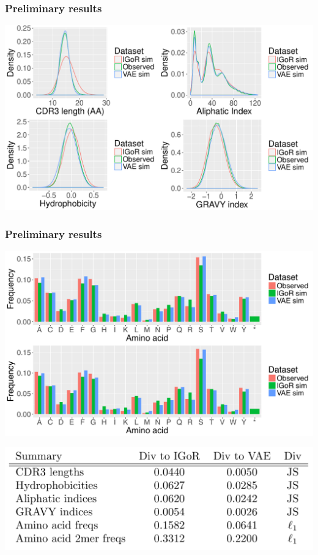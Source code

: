 \documentclass[mathserif,compress]{beamer}
\renewcommand\;{\,}
\begin{document}
\begin{frame}\frametitle{Preliminary results}
\begin{center}
\includegraphics[width=\linewidth]{Images/physiochem.pdf}
\end{center}
\end{frame}

\begin{frame}\frametitle{Preliminary results}
\begin{center}
\includegraphics[width=\linewidth]{Images/aa.pdf}
\end{center}
\begin{center}
\includegraphics[width=\linewidth]{Images/DivTable.png}
\end{center}
\end{frame}
\end{document}
